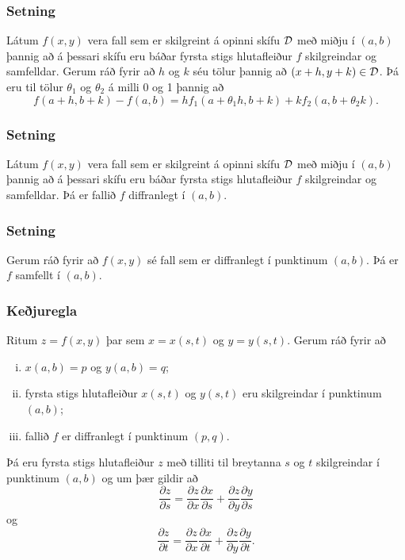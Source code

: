 \subsubsection{Setning }

Látum  $f(x,y)$ vera fall
sem er skilgreint á opinni 
skífu $\cal D$ með miðju í $(a,b)$ þannig að á þessari skífu eru báðar
fyrsta stigs hlutafleiður $f$ skilgreindar og samfelldar.  Gerum ráð fyrir að $h$
og $k$ séu tölur þannig að $(x+h, y+k)\in{\cal D}$.  Þá eru til tölur
$\theta_1$ og $\theta_2$ á milli 0 og 1 þannig að 
$$f(a+h,b+k)-f(a,b)=hf_1(a+\theta_1h,b+k)+kf_2(a,b+\theta_2k).$$


\subsubsection{Setning }
  Látum  $f(x,y)$ vera fall
sem er skilgreint á opinni 
skífu $\cal D$ með miðju í $(a,b)$ þannig að á þessari skífu eru báðar
fyrsta stigs hlutafleiður $f$ skilgreindar og samfelldar. 
Þá er fallið $f$ diffranlegt í $(a,b)$.




\subsubsection{Setning }
  Gerum ráð fyrir að $f(x,y)$ sé fall sem er
diffranlegt í punktinum $(a,b)$.  Þá er $f$ samfellt í $(a,b)$.




\subsubsection{Keðjuregla }
 Ritum $z=f(x,y)$ þar sem $x=x(s,t)$ og
$y=y(s,t)$.  Gerum ráð fyrir að 

\begin{enumerate}[(i)]
\item $x(a,b)=p$ og $y(a,b)=q$;
\item fyrsta stigs hlutafleiður $x(s,t)$ og $y(s,t)$ eru skilgreindar í
punktinum $(a,b)$;
\item fallið $f$ er diffranlegt í punktinum $(p,q)$.
\end{enumerate}

Þá eru fyrsta stigs hlutafleiður $z$ með tilliti til breytanna $s$ og
$t$ skilgreindar í punktinum $(a,b)$ og um þær gildir að 
$$\frac{\partial z}{\partial s}=
\frac{\partial z}{\partial x}\frac{\partial x}{\partial s}
+\frac{\partial z}{\partial y}\frac{\partial y}{\partial s}$$
og
$$\frac{\partial z}{\partial t}=
\frac{\partial z}{\partial x}\frac{\partial x}{\partial t}
+\frac{\partial z}{\partial y}\frac{\partial y}{\partial t}.$$




